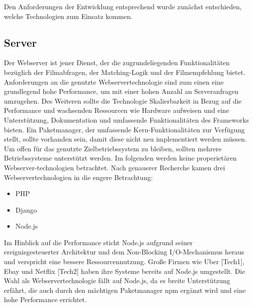 Den Anforderungen der Entwicklung entsprechend wurde zunächst entschieden, welche Technologien zum Einsatz kommen. 


\subsection{Server}
Der Webserver ist jener Dienst,  der die zugrundeliegenden Funktionalitäten bezüglich der Filmabfragen, der Matching-Logik und der Filmempfehlung bietet. 
Anforderungen an die genutzte Webservertechnologie sind zum einen eine grundlegend hohe Performance, um mit einer hohen Anzahl an Serveranfragen umzugehen. Des Weiteren sollte die Technologie Skalierbarkeit in Bezug auf die Performance und wachsenden Ressourcen wie Hardware aufweisen und eine Unterstützung, Dokumentation und umfassende Funktionalitäten des Frameworks bieten. 
Ein Paketmanager, der umfassende Kern-Funktionalitäten zur Verfügung stellt, sollte vorhanden sein, damit diese nicht neu implementiert werden müssen. Um offen für das genutzte Zielbetriebssystem zu bleiben, sollten mehrere Betriebssysteme unterstützt werden. 
Im folgenden werden keine properietären Webserver-technologien betrachtet.
\newline
Nach genauerer Recherche kamen drei Webservertechnologien in die engere Betrachtung:

\begin{itemize}
	\item PHP
	\item Django
	\item Node.js
\end{itemize} 

Im Hinblick auf die Performance sticht Node.js aufgrund seiner ereignisgesteuerter Architektur  und dem Non-Blocking I/O-Mechanismus heraus und verspricht eine bessere Ressourcennutzung. 
\newline
Große Firmen wie Uber [Tech1], Ebay und Netflix [Tech2] haben ihre Systeme bereits auf Node.js umgestellt. Die Wahl als Webservertechnologie fällt auf Node.js, da es breite Unterstützung erfährt, die auch durch den mächtigen Paketmanager npm ergänzt wird und eine hohe Performance errichtet.


